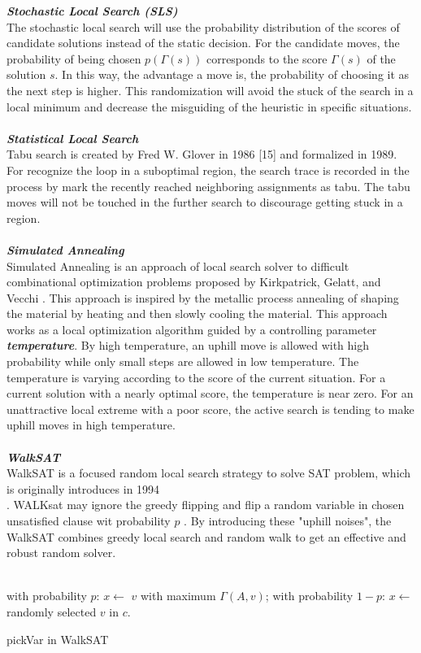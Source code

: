 \documentclass[12pt,a4paper,twoside]{scrartcl}
\numberwithin{equation}{section}
\begin{document}
\emph{\textbf{Stochastic Local Search (SLS)}}\\
The stochastic local search will use the probability distribution of the scores of candidate solutions instead of the static decision. For the candidate moves, the probability of being chosen $p(\Gamma(s))$ corresponds to the score $\Gamma(s)$ of the solution $s$. In this way, the advantage a move is, the probability of choosing it as the next step is higher. This randomization will avoid the stuck of the search in a local minimum and decrease the misguiding of the heuristic in specific situations. \\
\\
\emph{\textbf{Statistical Local Search }}\\
 Tabu search is created by Fred W. Glover in 1986 [15] and formalized in 1989.  For recognize the loop in a suboptimal region, the search trace is recorded in the process by mark the recently reached neighboring assignments as tabu. The tabu moves will not be touched in the further search to discourage getting stuck in a region. \\
\\
\emph{\textbf{Simulated Annealing}}\\
Simulated Annealing is an approach of local search solver to difficult combinational optimization problems proposed by Kirkpatrick, Gelatt, and Vecchi \cite{kirkpatrick1983optimization}. This approach is inspired by the metallic process annealing of shaping the material by heating and then slowly cooling the material. This approach works as a local optimization algorithm guided by a controlling parameter \emph{\textbf{temperature}}. By high temperature, an uphill move is allowed with high probability while only small steps are allowed in low temperature. The temperature is varying according to the score of the current situation.  For a current solution with a nearly optimal score, the temperature is near zero. For an unattractive local extreme with a poor score, the active search is tending to make uphill moves in high temperature.\\
\\
\emph{\textbf{WalkSAT}}\\
WalkSAT is a focused random local search strategy to solve SAT problem, which is originally introduces in 1994 \cite{hoos2002adaptive}\\. WALKsat may ignore the greedy flipping and flip a random variable in chosen unsatisfied clause wit probability $p$ . By introducing these "uphill noises", the WalkSAT combines greedy local search and random walk to get an effective and robust random solver. \\
\\
\begin{algorithm}[H]
  with probability $p$: $x \leftarrow$   $v$ with maximum $\Gamma(A,v)$; \;
  with probability $1-p$:  $x \leftarrow$  randomly selected $v$ in $c$. 
 \caption{pickVar in WalkSAT}
\end{algorithm}  
\end{document}
